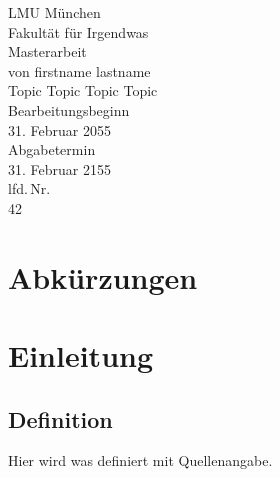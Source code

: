 \documentclass[
parskip=true,  %
fontsize=12pt, %
BCOR=12mm,     %
twoside=false,  %
numbers=noenddot %
]{scrreprt}
\begin{document}
%  

\begin{titlepage}
  \begin{center}
    \Large
    LMU München\\
    \large
    Fakultät für Irgendwas\\
    \vspace{15mm}
    \LARGE
    Masterarbeit\\
    \large
    von firstname lastname\\
    \vspace{15mm}
    \LARGE
    Topic Topic Topic Topic\\
    \vspace{15mm}
    \large
    Bearbeitungsbeginn\\
    \Large
    31. Februar 2055\\
    \vspace{5mm}
    \large
    Abgabetermin\\
    \Large
    31. Februar 2155\\
    \vspace{15mm}
    \large
    lfd.\,Nr.\\
    \Large
    42
  \end{center}
\end{titlepage}


\tableofcontents
\listoffigures
\listoftables

\chapter*{Abkürzungen}

\begin{acronym}
\end{acronym}


\chapter{Einleitung}

\section{Definition}

Hier wird was definiert mit Quellenangabe\cite{wiki:muenchen}.
\end{document}
